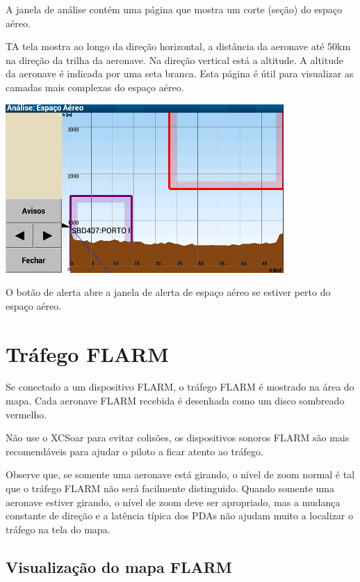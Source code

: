 A janela de análise contém uma página que mostra um corte (seção) do espaço aéreo.

TA tela mostra ao longo da direção horizontal, a distância da aeronave até 50km na direção da trilha da aeronave.  Na direção vertical está a altitude.  A altitude da aeronave é indicada por uma seta branca.  Esta página é útil para visualizar as camadas mais complexas do espaço aéreo.

\begin{center}
\includegraphics[angle=0,width=0.8\linewidth,keepaspectratio='true']{figures/analysis-airspace.png}
\end{center}

O botão de alerta abre a janela de alerta de espaço aéreo se estiver perto do espaço aéreo.


\section{Tráfego FLARM }

Se conectado a um dispositivo FLARM, o tráfego FLARM é mostrado na área do mapa.  Cada aeronave FLARM recebida é desenhada como um disco sombreado vermelho.

\warning Não use o XCSoar para evitar colisões, os dispositivos sonoros FLARM são mais recomendáveis para ajudar o piloto a ficar atento ao tráfego.

Observe que, se somente uma aeronave está girando, o nível de zoom normal é tal que o tráfego FLARM não será facilmente distinguido.  Quando somente uma aeronave estiver girando, o nível de zoom deve ser apropriado, mas a mudança constante de direção e a latência típica dos PDAs não ajudam muito a localizar o tráfego na tela do mapa.


\subsection*{Visualização do mapa FLARM}

